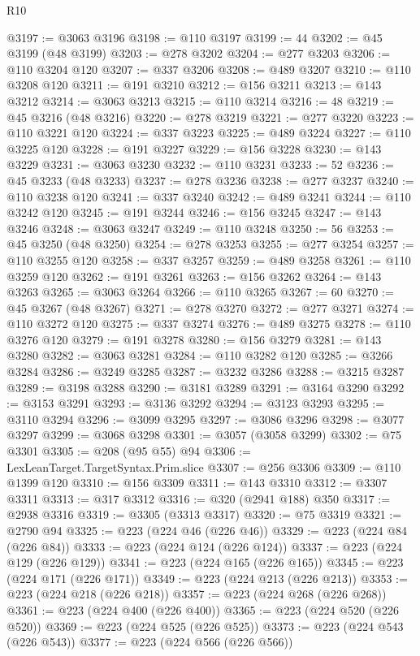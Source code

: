 \begin{lexlean}{R10}
\begin{coremodule}
{{{{{{{{{{{{{{{{{{{{{{{{{{{{{{{{{{{{{{{{{{{{{{{{{{{{{{{{{{{{{{{{{{{{{{{{{{{{{{{{{{{{@3197 := @3063 @3196
@3198 := @110 @3197
@3199 := 44
@3202 := @45 @3199 (@48 @3199)
@3203 := @278 @3202
@3204 := @277 @3203
@3206 := @110 @3204 @120
@3207 := @337 @3206
@3208 := @489 @3207
@3210 := @110 @3208 @120
@3211 := @191 @3210
@3212 := @156 @3211
@3213 := @143 @3212
@3214 := @3063 @3213
@3215 := @110 @3214
@3216 := 48
@3219 := @45 @3216 (@48 @3216)
@3220 := @278 @3219
@3221 := @277 @3220
@3223 := @110 @3221 @120
@3224 := @337 @3223
@3225 := @489 @3224
@3227 := @110 @3225 @120
@3228 := @191 @3227
@3229 := @156 @3228
@3230 := @143 @3229
@3231 := @3063 @3230
@3232 := @110 @3231
@3233 := 52
@3236 := @45 @3233 (@48 @3233)
@3237 := @278 @3236
@3238 := @277 @3237
@3240 := @110 @3238 @120
@3241 := @337 @3240
@3242 := @489 @3241
@3244 := @110 @3242 @120
@3245 := @191 @3244
@3246 := @156 @3245
@3247 := @143 @3246
@3248 := @3063 @3247
@3249 := @110 @3248
@3250 := 56
@3253 := @45 @3250 (@48 @3250)
@3254 := @278 @3253
@3255 := @277 @3254
@3257 := @110 @3255 @120
@3258 := @337 @3257
@3259 := @489 @3258
@3261 := @110 @3259 @120
@3262 := @191 @3261
@3263 := @156 @3262
@3264 := @143 @3263
@3265 := @3063 @3264
@3266 := @110 @3265
@3267 := 60
@3270 := @45 @3267 (@48 @3267)
@3271 := @278 @3270
@3272 := @277 @3271
@3274 := @110 @3272 @120
@3275 := @337 @3274
@3276 := @489 @3275
@3278 := @110 @3276 @120
@3279 := @191 @3278
@3280 := @156 @3279
@3281 := @143 @3280
@3282 := @3063 @3281
@3284 := @110 @3282 @120
@3285 := @3266 @3284
@3286 := @3249 @3285
@3287 := @3232 @3286
@3288 := @3215 @3287
@3289 := @3198 @3288
@3290 := @3181 @3289
@3291 := @3164 @3290
@3292 := @3153 @3291
@3293 := @3136 @3292
@3294 := @3123 @3293
@3295 := @3110 @3294
@3296 := @3099 @3295
@3297 := @3086 @3296
@3298 := @3077 @3297
@3299 := @3068 @3298
@3301 := @3057 (@3058 @3299)
@3302 := @75 @3301
@3305 := @208 (@95 @55) @94
@3306 := LexLeanTarget.TargetSyntax.Prim.slice
@3307 := @256 @3306
@3309 := @110 @1399 @120
@3310 := @156 @3309
@3311 := @143 @3310
@3312 := @3307 @3311
@3313 := @317 @3312
@3316 := @320 (@2941 @188) @350
@3317 := @2938 @3316
@3319 := @3305 (@3313 @3317)
@3320 := @75 @3319
@3321 := @2790 @94
@3325 := @223 (@224 @46 (@226 @46))
@3329 := @223 (@224 @84 (@226 @84))
@3333 := @223 (@224 @124 (@226 @124))
@3337 := @223 (@224 @129 (@226 @129))
@3341 := @223 (@224 @165 (@226 @165))
@3345 := @223 (@224 @171 (@226 @171))
@3349 := @223 (@224 @213 (@226 @213))
@3353 := @223 (@224 @218 (@226 @218))
@3357 := @223 (@224 @268 (@226 @268))
@3361 := @223 (@224 @400 (@226 @400))
@3365 := @223 (@224 @520 (@226 @520))
@3369 := @223 (@224 @525 (@226 @525))
@3373 := @223 (@224 @543 (@226 @543))
@3377 := @223 (@224 @566 (@226 @566))
}}}}}}}}}}}}}}}}}}}}}}}}}}}}}}}}}}}}}}}}}}}}}}}}}}}}}}}}}}}}}}}}}}}}}}}}}}}}}}}}}}}}
\end{coremodule}
\end{lexlean}
